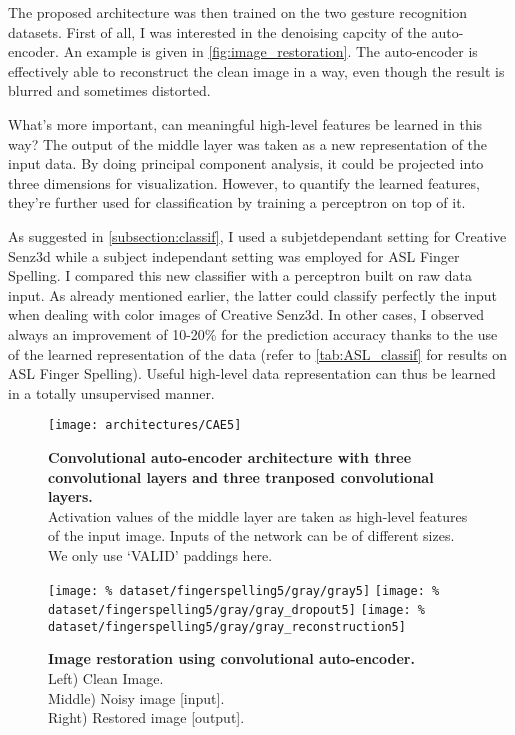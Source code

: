 The proposed architecture was then trained on the two gesture recognition
datasets. First of all, I was interested in the denoising capcity of
the auto-encoder. An example is given in \autoref{fig:image_restoration}.
The auto-encoder is effectively able to reconstruct the clean image in
a way, even though the result is blurred and sometimes distorted.

What's more important, can meaningful high-level features be
learned in this way? The output of the middle layer was taken as a
new representation of the input data.
By doing principal component analysis, it could be projected into
three dimensions for visualization.
However, to quantify the learned features, they're further used for
classification by training a perceptron on top of it.

As suggested in \ref{subsection:classif}, I used a subjetdependant setting
for Creative Senz3d while a subject independant setting was employed
for ASL Finger Spelling. I compared this new classifier with a
perceptron built on raw data input. As already mentioned earlier, the
latter could classify perfectly the input when dealing with color images
of Creative Senz3d. In other cases, I observed always an improvement
of 10-20\% for the prediction accuracy thanks to the use of the
learned representation of the data (refer to \autoref{tab:ASL_classif}
for results on ASL Finger Spelling). Useful high-level data representation
can thus be learned in a totally unsupervised manner.

\begin{figure}[H]
  \centering
  \texttt{[image: architectures/CAE5]}
  \caption{%
    \textbf{Convolutional auto-encoder architecture with 
      three convolutional layers and three tranposed convolutional
      layers.}\\[0.1em]
    Activation values of the middle layer are taken as 
      high-level features of the input image. Inputs of the network
      can be of different sizes. We only use `VALID' paddings here.}
  \label{fig:CAE5}
\end{figure}

\begin{figure}[H]
  \centering
  \hfill
  \texttt{[image: \%
    dataset/fingerspelling5/gray/gray5]}
  \hfill
  \texttt{[image: \%
    dataset/fingerspelling5/gray/gray\_dropout5]}
  \hfill
  \texttt{[image: \%
    dataset/fingerspelling5/gray/gray\_reconstruction5]}
  \caption{%
    \textbf{Image restoration using convolutional auto-encoder.}\\[0.1em]
      Left) Clean Image.\\[0.1em]
      Middle) Noisy image [input].\\[0.1em]
      Right) Restored image [output].}
  \label{fig:image_restoration}
\end{figure}

